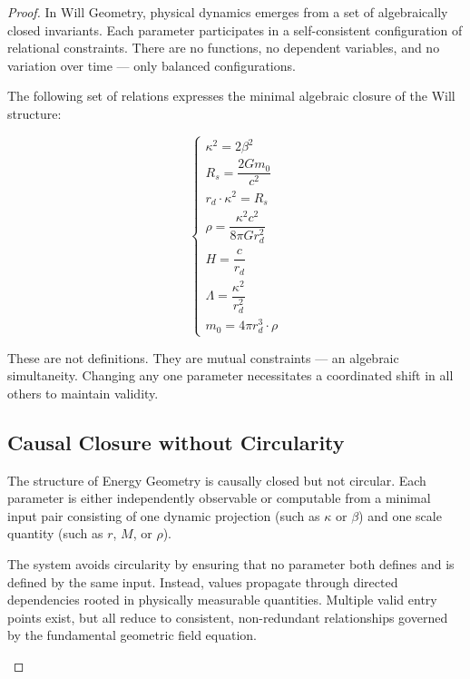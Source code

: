 \documentclass{article}
\begin{document}
\begin{proof}
In Will Geometry, physical dynamics emerges from a set of algebraically closed invariants.  
Each parameter participates in a self-consistent configuration of relational constraints.  
There are no functions, no dependent variables, and no variation over time --- only balanced configurations.

The following set of relations expresses the minimal algebraic closure of the Will structure:

\[
\begin{cases}
\kappa^2 = 2 \beta^2 \\
R_s = \dfrac{2G m_0}{c^2} \\
r_{d} \cdot \kappa^2 = R_s \\
\rho = \dfrac{\kappa^2 c^2}{8\pi Gr_{d}^2} \\
H = \dfrac{c}{r_{d}} \\
\Lambda = \dfrac{\kappa^2}{r_{d}^2} \\
m_0 = 4\pi r_{d}^3 \cdot \rho
\end{cases}
\]

These are not definitions.  
They are mutual constraints --- an algebraic simultaneity.  
Changing any one parameter necessitates a coordinated shift in all others to maintain validity.

\subsection*{Causal Closure without Circularity}

The structure of Energy Geometry is causally closed but not circular.  
Each parameter is either independently observable or computable from a minimal input pair  
consisting of one dynamic projection (such as $\kappa$ or $\beta$) and one scale quantity (such as $r$, $M$, or $\rho$).

The system avoids circularity by ensuring that no parameter both defines and is defined by the same input.  
Instead, values propagate through directed dependencies rooted in physically measurable quantities.  
Multiple valid entry points exist, but all reduce to consistent, non-redundant relationships  
governed by the fundamental geometric field equation.

\begin{center}
\end{center}
\end{proof}
\end{document}
